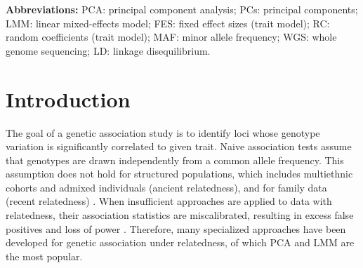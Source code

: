 \documentclass[11pt]{article}
\begin{document}
\begin{linenumbers}
\textbf{Abbreviations:}
PCA: principal component analysis;
PCs: principal components;
LMM: linear mixed-effects model;
FES: fixed effect sizes (trait model);
RC: random coefficients (trait model);
MAF: minor allele frequency;
WGS: whole genome sequencing;
LD: linkage disequilibrium.

\section{Introduction} 

The goal of a genetic association study is to identify loci whose genotype variation is significantly correlated to given trait.
Naive association tests assume that genotypes are drawn independently from a common allele frequency.
This assumption does not hold for structured populations, which includes multiethnic cohorts and admixed individuals (ancient relatedness), and for family data (recent relatedness) \citep{astle_population_2009}.
When insufficient approaches are applied to data with relatedness, their association statistics are miscalibrated, resulting in excess false positives and loss of power \citep{devlin_genomic_1999, voight_confounding_2005, astle_population_2009}.
Therefore, many specialized approaches have been developed for genetic association under relatedness, of which PCA and LMM are the most popular.


\end{linenumbers}
\end{document}
